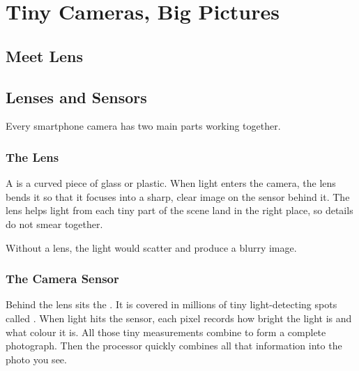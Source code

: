 
\chapter{Tiny Cameras, Big Pictures}


\section*{Meet Lens}


\sectionrule

\section*{Lenses and Sensors}

Every smartphone camera has two main parts working together.

\subsection*{The Lens}
A  is a curved piece of glass or plastic.
When light enters the camera, the lens bends it so that it focuses
into a sharp, clear image on the sensor behind it.
The lens helps light from each tiny part of the scene land in the right place,
so details do not smear together.

Without a lens, the light would scatter and produce a blurry image.

\subsection*{The Camera Sensor}
Behind the lens sits the .
It is covered in millions of tiny light-detecting spots called .
When light hits the sensor, each pixel records how bright the light is
and what colour it is.
All those tiny measurements combine to form a complete photograph.
Then the processor quickly combines all that information into the photo you see.

